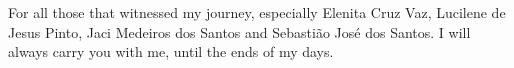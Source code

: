 For all those that witnessed my journey, especially Elenita Cruz Vaz, Lucilene de Jesus Pinto, Jaci Medeiros dos Santos and Sebastião José dos Santos. I will always carry you with me, until the ends of my days.